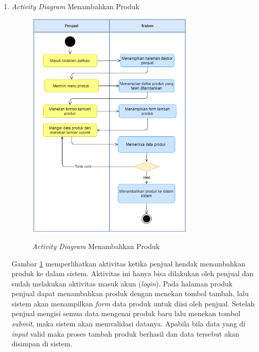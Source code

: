 \begin{enumerate}
	\item \textit{Activity Diagram} Menambahkan Produk
	\begin{figure}[H]
		\centering
		{\includegraphics [width = 8cm, height= 11cm]{gambar/activity diagram/jual produk}}
		\caption{\textit{Activity Diagram} Menambahkan Produk}
		\label{jual produk}
	\end{figure}
	\par Gambar \ref*{jual produk} memperlihatkan aktivitas ketika penjual hendak menambahkan produk ke dalam sistem. Aktivitas ini hanya bisa dilakukan oleh penjual dan sudah melakukan aktivitas masuk akun (\textit{login}). Pada halaman produk penjual dapat menambahkan produk dengan menekan tombol tambah, lalu sistem akan menampilkan \textit{form} data produk untuk diisi oleh penjual. Setelah penjual mengisi semua data mengenai produk baru lalu menekan tombol \textit{submit}, maka sistem akan memvalidasi datanya. Apabila bila data yang di \textit{input} valid maka proses tambah produk berhasil dan data tersebut akan disimpan di sistem.


\end{enumerate}
